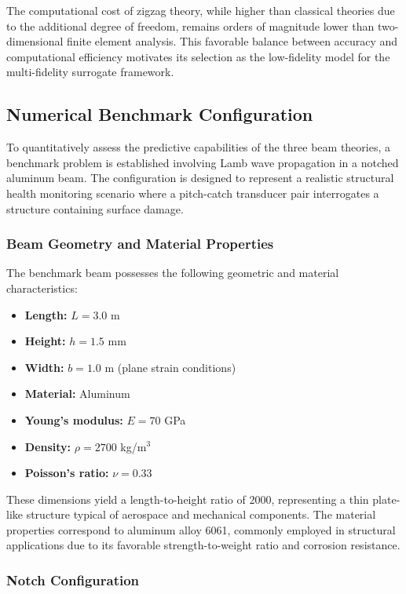 \documentclass[12pt,a4paper]{report}
\begin{document}
The computational cost of zigzag theory, while higher than classical theories due to the additional degree of freedom, remains orders of magnitude lower than two-dimensional finite element analysis. This favorable balance between accuracy and computational efficiency motivates its selection as the low-fidelity model for the multi-fidelity surrogate framework.

\subsection{Numerical Benchmark Configuration}

To quantitatively assess the predictive capabilities of the three beam theories, a benchmark problem is established involving Lamb wave propagation in a notched aluminum beam. The configuration is designed to represent a realistic structural health monitoring scenario where a pitch-catch transducer pair interrogates a structure containing surface damage.

\subsubsection{Beam Geometry and Material Properties}

The benchmark beam possesses the following geometric and material characteristics:

\begin{itemize}
    \item \textbf{Length:} $L = 3.0$ m
    \item \textbf{Height:} $h = 1.5$ mm
    \item \textbf{Width:} $b = 1.0$ m (plane strain conditions)
    \item \textbf{Material:} Aluminum
    \item \textbf{Young's modulus:} $E = 70$ GPa
    \item \textbf{Density:} $\rho = 2700$ kg/m$^3$
    \item \textbf{Poisson's ratio:} $\nu = 0.33$
\end{itemize}

These dimensions yield a length-to-height ratio of 2000, representing a thin plate-like structure typical of aerospace and mechanical components. The material properties correspond to aluminum alloy 6061, commonly employed in structural applications due to its favorable strength-to-weight ratio and corrosion resistance.

\subsubsection{Notch Configuration}
\end{document}
